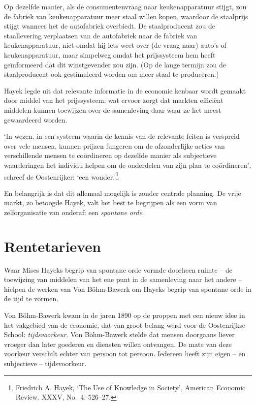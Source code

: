 \documentclass[
  a5paper,
  smalldemyvopaper,11pt,twoside,onecolumn,openright,extrafontsizes]{memoir}
\begin{document}
Op dezelfde manier, als de consumentenvraag naar keukenapparatuur
stijgt, zou de fabriek van keukenapparatuur meer staal willen kopen,
waardoor de staalprijs stijgt wanneer het de autofabriek overbiedt. De
staalproducent zou de staallevering verplaatsen van de autofabriek naar
de fabriek van keukenapparatuur, niet omdat hij iets weet over (de vraag
naar) auto's of keukenapparatuur, maar simpelweg omdat het prijssysteem
hem heeft geïnformeerd dat dit winstgevender zou zijn. (Op de lange
termijn zou de staalproducent ook gestimuleerd worden om meer staal te
produceren.)

Hayek legde uit dat relevante informatie in de economie kenbaar wordt
gemaakt door middel van het prijssysteem, wat ervoor zorgt dat markten
efficiënt middelen kunnen toewijzen over de samenleving daar waar ze het
meest gewaardeerd worden.

`In wezen, in een systeem waarin de kennis van de relevante feiten is
verspreid over vele mensen, kunnen prijzen fungeren om de afzonderlijke
acties van verschillende mensen te coördineren op dezelfde manier als
subjectieve waarderingen het individu helpen om de onderdelen van zijn
plan te coördineren', schreef de Oostenrijker: `een wonder.'\footnote{Friedrich
  A. Hayek, `The Use of Knowledge in Society', American Economic Review.
  XXXV, No.~4: 526--27.}

En belangrijk is dat dit allemaal mogelijk is zonder centrale planning.
De vrije markt, zo betoogde Hayek, valt het best te begrijpen als een
vorm van zelforganisatie van onderaf: een \emph{spontane orde}.

\section{Rentetarieven}\label{rentetarieven}

Waar Mises Hayeks begrip van spontane orde vormde doorheen ruimte -- de
toewijzing van middelen van het ene punt in de samenleving naar het
andere -- hielpen de werken van Von Böhm-Bawerk om Hayeks begrip van
spontane orde in de tijd te vormen.

Von Böhm-Bawerk kwam in de jaren 1890 op de proppen met een nieuw idee
in het vakgebied van de economie, dat van groot belang werd voor de
Oostenrijkse School: \emph{tijdsvoorkeur}. Von Böhm-Bawerk stelde dat
mensen doorgaans liever vroeger dan later goederen en diensten willen
ontvangen. De mate van deze voorkeur verschilt echter van persoon tot
persoon. Iedereen heeft zijn eigen -- en subjectieve -- tijdsvoorkeur.
\end{document}
